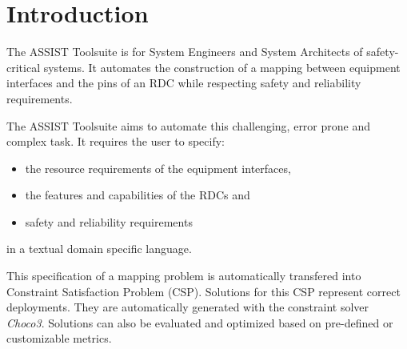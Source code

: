 
\chapter{Introduction}
\label{cha:introduction}

The ASSIST Toolsuite is for System Engineers and System Architects of safety-critical systems. 
It automates the construction of a mapping between equipment interfaces and the pins of an RDC while respecting safety and reliability requirements.

The ASSIST Toolsuite aims to automate this challenging, error prone and complex task. 
It requires the user to specify:

\begin{itemize}
\item the resource requirements of the equipment interfaces,
\item the features and capabilities of the RDCs and
\item safety and reliability requirements
\end{itemize}

in a textual domain specific language.

This specification of a mapping problem is automatically transfered into Constraint Satisfaction Problem (CSP). 
Solutions for this CSP represent correct deployments. 
They are automatically generated with the constraint solver \emph{Choco3}. 
Solutions can also be evaluated and optimized based on pre-defined or customizable metrics.

